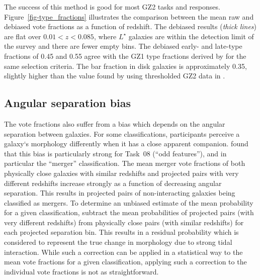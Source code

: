 \documentclass[useAMS,usenatbib]{mn2e}
\newcommand{\mr}{$M_r$}
\newcommand{\rfifty}{$R_{50}$}
\begin{document}

The success of this method is good for most GZ2 tasks and responses. Figure~\ref{fig-type_fractions} illustrates the comparison between the mean raw and debiased vote fractions as a function of redshift. The debiased results ({\it thick lines}) are flat over $0.01<z<0.085$, where $L^\star$ galaxies \citep[$M_r\sim-20.44$;][]{bla03a} are within the detection limit of the survey and there are fewer empty bins. The debiased early- and late-type fractions of 0.45 and 0.55 agree with the GZ1 type fractions derived by \citet{bam09} for the same selection criteria. The bar fraction in disk galaxies is approximately 0.35, slightly higher than the value found by using thresholded GZ2 data in \citet{mas11c}.

\subsection{Angular separation bias}\label{ang-bias}

The vote fractions also suffer from a bias which depends on the angular separation between galaxies. For some classifications, participants perceive a galaxy`s morphology differently when it has a close apparent companion. \citet{cas13} found that this bias is particularly strong for Task~08 (``odd features''), and in particular the ``merger'' classification. The mean merger vote fractions of both physically close galaxies with similar redshifts and projected pairs with very different redshifts increase strongly as a function of decreasing angular separation. This results in projected pairs of non-interacting galaxies being classified as mergers. To determine an unbiased estimate of the mean probability for a given classification, \citet{cas13} subtract the mean probabilities of projected pairs (with very different redshifts) from physically close pairs (with similar redshifts) for each projected separation bin. This results in a residual probability which is considered to represent the true change in morphology due to strong tidal interaction. While such a correction can be applied in a statistical way to the mean vote fractions for a given classification, applying such a correction to the individual vote fractions is not as straightforward.
\end{document}

